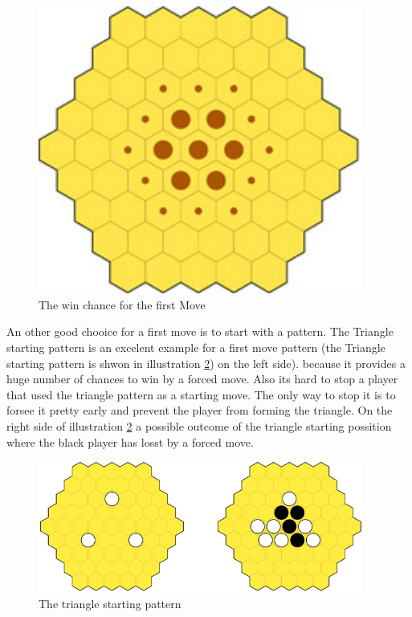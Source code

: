 \documentclass[german]{report}
\begin{document}
\begin{figure}[ht]
\centering
\includegraphics[width=0.95\textwidth]{Abbildungen/yav_winChance.png}
\caption[The win chance for the first Move, Source:\cite{yvalathHP}]{The win chance for the first Move}
\label{fig:yav_winChance}
\end{figure}


An other good chooice for a first move is to start with a pattern. The Triangle starting pattern is an excelent example for a first move pattern (the Triangle starting pattern is shwon in illustration \ref{fig:yav_triangle}) on the left side). because it provides a huge number of chances to win by a forced move. Also its hard to stop a player that used the triangle pattern as a starting move. The only way to stop it is to forsee it pretty early and prevent the player from forming the triangle.
On the right side of illustration \ref{fig:yav_triangle} a possible outcome of the triangle starting possition where the black player has losst by a forced move.\cite{yvalathHP}

\begin{figure}[ht]
\centering
\includegraphics[width=0.95\textwidth]{Abbildungen/yav_triangle.png}
\caption[The triangle starting pattern, Source:\cite{yvalathHP}]{The triangle starting pattern}
\label{fig:yav_triangle}
\end{figure}
\end{document}
